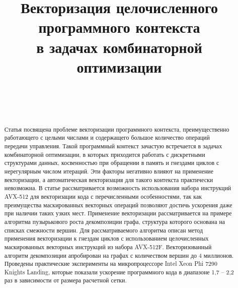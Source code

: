 \documentclass[
11pt,%
tightenlines,%
twoside,%
onecolumn,%
nofloats,%
nobibnotes,%
nofootinbib,%
superscriptaddress,%
noshowpacs,%
centertags]%
{revtex4}
\begin{document}

\title{Векторизация целочисленного программного контекста \\ в задачах комбинаторной оптимизации}

\author{~}

\author{~}




\begin{abstract} %
Статья посвящена проблеме векторизации программного контекста, преимущественно работающего с целыми числами и содержащего большое количество операций передачи управления.
Такой программный контекст зачастую встречается в задачах комбинаторной оптимизации, в которых приходится работать с дискретными структурами данных, косвенностью при обращении в память и гнездами циклов с нерегулярным числом итераций.
Эти факторы негативно влияют на применение векторизации, а автоматическая векторизация для такого контекста практически невозможна.
В статье рассматривается возможность использования набора инструкций AVX-512 для векторизации кода с перечисленными особенностями, так как преимущества маскированных векторных операций позволяют достичь ускорения даже при наличии таких узких мест.
Применение векторизации рассматривается на примере алгоритма пузырькового роста декомпозиции графа, структура которого основана на списках смежности вершин.
Для рассматриваемого алгоритма описан метод применения векторизации к гнездам циклов с использованием целочисленных маскированных векторных инструкций из набора AVX-512F.
Векторизованный алгоритм декомпозиции апробирован на графах с количеством вершин до 4 миллионов.
Проведены практические эксперименты на микропроцессоре Intel Xeon Phi 7290 Knights Landing, которые показали ускорение программного кода в диапазоне 1,7 -- 2,2 раз в зависимости от размера расчетной сетки.
\end{abstract}
\end{document}
